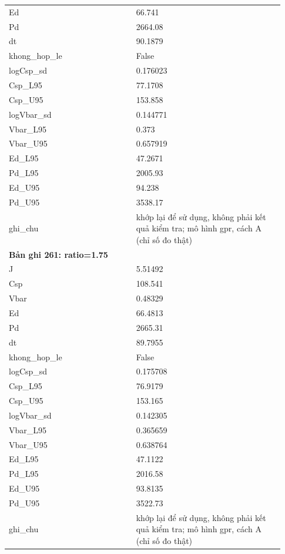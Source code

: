 \begin{longtable}{p{0.43\linewidth}p{0.50\linewidth}}
Ed & 66.741 \\
Pd & 2664.08 \\
dt & 90.1879 \\
khong\_\allowbreak hop\_\allowbreak le & False \\
logCsp\_\allowbreak sd & 0.176023 \\
Csp\_\allowbreak L95 & 77.1708 \\
Csp\_\allowbreak U95 & 153.858 \\
logVbar\_\allowbreak sd & 0.144771 \\
Vbar\_\allowbreak L95 & 0.373 \\
Vbar\_\allowbreak U95 & 0.657919 \\
Ed\_\allowbreak L95 & 47.2671 \\
Pd\_\allowbreak L95 & 2005.93 \\
Ed\_\allowbreak U95 & 94.238 \\
Pd\_\allowbreak U95 & 3538.17 \\
ghi\_\allowbreak chu & khớp lại để sử dụng, không phải kết quả kiểm tra; mô hình gpr, cách A (chỉ số đo thật) \\
\midrule
\multicolumn{2}{p{0.95\linewidth}}{\textbf{Bản ghi 261: ratio=1.75}} \\
J & 5.51492 \\
Csp & 108.541 \\
Vbar & 0.48329 \\
Ed & 66.4813 \\
Pd & 2665.31 \\
dt & 89.7955 \\
khong\_\allowbreak hop\_\allowbreak le & False \\
logCsp\_\allowbreak sd & 0.175708 \\
Csp\_\allowbreak L95 & 76.9179 \\
Csp\_\allowbreak U95 & 153.165 \\
logVbar\_\allowbreak sd & 0.142305 \\
Vbar\_\allowbreak L95 & 0.365659 \\
Vbar\_\allowbreak U95 & 0.638764 \\
Ed\_\allowbreak L95 & 47.1122 \\
Pd\_\allowbreak L95 & 2016.58 \\
Ed\_\allowbreak U95 & 93.8135 \\
Pd\_\allowbreak U95 & 3522.73 \\
ghi\_\allowbreak chu & khớp lại để sử dụng, không phải kết quả kiểm tra; mô hình gpr, cách A (chỉ số đo thật) \\

\end{longtable}

